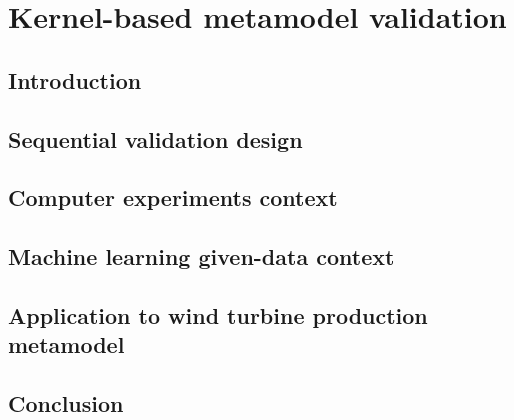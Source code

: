 \chapter{Kernel-based metamodel validation}
\hfill
\localtableofcontents
\newpage

\section{Introduction}
\section{Sequential validation design}
\section{Computer experiments context}
\section{Machine learning given-data context}
\section{Application to wind turbine production metamodel}
\section{Conclusion}